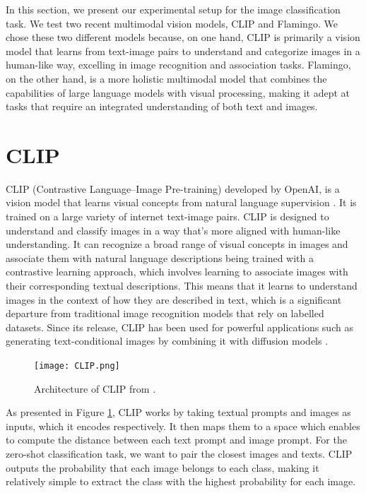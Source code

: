 
In this section, we present our experimental setup for the image classification task. We test two recent multimodal vision models, CLIP and Flamingo. We chose these two different models because, on one hand, CLIP is primarily a vision model that learns from text-image pairs to understand and categorize images in a human-like way, excelling in image recognition and association tasks. Flamingo, on the other hand, is a more holistic multimodal model that combines the capabilities of large language models with visual processing, making it adept at tasks that require an integrated understanding of both text and images.

\section{CLIP} 

CLIP %
(Contrastive Language–Image Pre-training) developed by OpenAI, is a vision model that learns visual concepts from natural language supervision \parencite{radford2021learning}. It is trained on a large variety of internet text-image pairs. CLIP is designed to understand and classify images in a way that's more aligned with human-like understanding. It can recognize a broad range of visual concepts in images and associate them with natural language descriptions being trained with a contrastive learning approach, which involves learning to associate images with their corresponding textual descriptions. This means that it learns to understand images in the context of how they are described in text, which is a significant departure from traditional image recognition models that rely on labelled datasets. Since its release, CLIP has been used for powerful applications such as generating text-conditional images by combining it with diffusion models \parencite{ramesh2022hierarchical}.

\begin{figure}[h]
  \centering
  \texttt{[image: CLIP.png]}
  \caption{Architecture of CLIP from \cite{radford2021learning}.}
  \label{fig:CLIP}
\end{figure}


As presented in Figure \ref{fig:CLIP}, CLIP works by taking  textual prompts and images as inputs, which it encodes respectively. It then maps them to a space which enables to compute the distance between each text prompt and image prompt. For the zero-shot classification task, we want to pair the closest images and texts. CLIP outputs the probability that each image belongs to each class, making it relatively simple to extract the class with the highest probability for each image.

